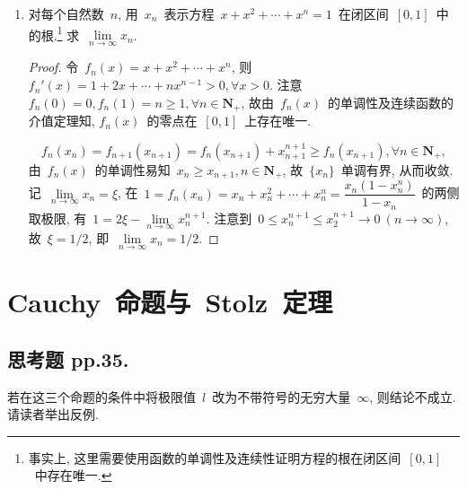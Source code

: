 \documentclass[UTF8,a4paper,11pt,twoside]{book}
\begin{document}
\begin{enumerate}
\begin{proof}
		      充分性. 不妨设~$\{a_n\}$~单调增加, 则其任意子列也单调增加. 设~$\lim\limits_{n\to\infty} x_{n_k}=a$. 则由~3~可知, $\forall k\in\mathbf{N}_{+}, a_{n_k}\leqslant a$. 若~$\{a_n\}$~无上界, 则存在~$n_0\in\mathbf{N}_{+}$~使得~$x_{n_0}>a$, 从而对于充分大的~$k\in\mathbf{N}_{+}$, 有~$a_{n_k}\geqslant a_{n_0}>a$. 这与~$a_{n_k}\leqslant a, \forall k\in\mathbf{N}_{+}$~矛盾. 故~$\{a_n\}$~有上界. 从而由单调有界原理, $\{a_n\}$~收敛.
	      \end{proof}
	\item 对每个自然数~$n$, 用~$x_n$~表示方程~$x+x^2+\cdots+x^n=1$~在闭区间~$[0,1]$~中的根.\footnote{事实上, 这里需要使用函数的单调性及连续性证明方程的根在闭区间~$[0,1]$~中存在唯一.} 求~$\lim\limits_{n\to\infty} x_n$.
	      \begin{proof}
		      令~$f_n(x)=x+x^2+\cdots+x^n$, 则~$f_n'(x)=1+2x+\cdots+nx^{n-1}>0, \forall x>0$. 注意~$f_n(0)=0, f_n(1)=n\geqslant 1, \forall n\in\mathbf{N}_{+}$, 故由~$f_n(x)$~的单调性及连续函数的介值定理知, $f_n(x)$~的零点在~$[0,1]$~上存在唯一.

		      \[
			      f_n(x_n)=f_{n+1}(x_{n+1})=f_n(x_{n+1})+x_{n+1}^{n+1}\geqslant f_n(x_{n+1}), \forall n\in\mathbf{N}_{+},
		      \]
		      由~$f_n(x)$~的单调性易知~$x_n\geqslant x_{n+1}, n\in\mathbf{N}_{+}$, 故~$\{x_n\}$~单调有界, 从而收敛. 记~$\lim\limits_{n\to\infty} x_n=\xi$, 在~$1=f_n(x_n)=x_n+x_n^2+\cdots+x_n^n=\dfrac{x_n(1-x_n^n)}{1-x_n}$~的两侧取极限, 有~$1=2\xi-\lim\limits_{n\to\infty} x_n^{n+1}$. 注意到~$0\leqslant x_n^{n+1}\leqslant x_2^{n+1}\to 0\ (n\to\infty)$, 故~$\xi=1/2$, 即~$\lim\limits_{n\to\infty} x_n=1/2$.\qedhere
	      \end{proof}
\end{enumerate}

\section{Cauchy~命题与~Stolz~定理}
\subsection{思考题 pp.35.}
若在这三个命题的条件中将极限值~$l$~改为不带符号的无穷大量~$\infty$, 则结论不成立. 请读者举出反例.
\end{document}

